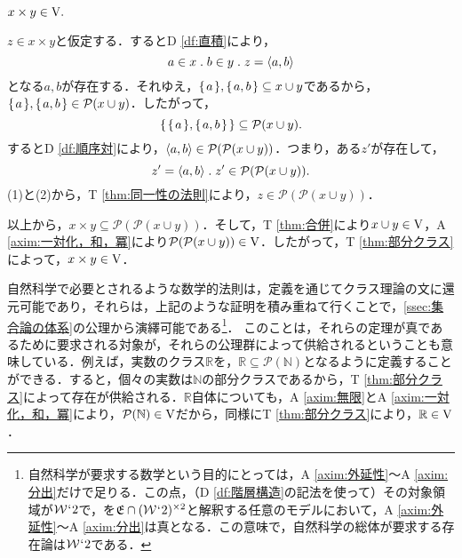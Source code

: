 \begin{thm}[直積]
\label{thm:直積}
$
    x\times y\in\mathrm{V}.
$
\end{thm}
\setcounter{equation}{0}
\begin{pf}
    $ z\in x\times y $と仮定する．するとD \ref{df:直積}により，
    \begin{equation}
        a\in x\con{1}b\in y\con{1}z = \orp{a,b}
    \end{equation}
    となる$a,b$が存在する．それゆえ，$ \{\mspace{2mu}a\mspace{2mu}\},\{\mspace{2mu}a,b\mspace{2mu}\}\subseteq x\cup y $であるから，$ \{\mspace{2mu}a\mspace{2mu}\},\{\mspace{2mu}a,b\mspace{2mu}\}\in\mathcal{P}(x\cup y)$．したがって，
    \[
        \{\mspace{2mu}\{\mspace{2mu}a\mspace{2mu}\},\{\mspace{2mu}a,b\mspace{2mu}\}\mspace{2mu}\}\subseteq\mathcal{P}(x\cup y).
    \]
    するとD \ref{df:順序対}により，$ \langle a,b \rangle\in\mathcal{P}(\mathcal{P}(x\cup y)) $．つまり，ある$ z' $が存在して，
    \begin{equation}
        z'=\orp{a,b}\con{1}z'\in \mathcal{P}(\mathcal{P}(x\cup y)).
    \end{equation}
    (1)と(2)から，T \ref{thm:同一性の法則}により，$ z\in\mathcal{P}(\mathcal{P}(x\cup y)) $．

    以上から，$ x\times y\subseteq \mathcal{P}(\mathcal{P}(x\cup y)) $．そして，T \ref{thm:合併}により$x\cup y\in\mathrm{V}$，A \ref{axim:一対化，和，冪}により$\mathcal{P}(\mathcal{P}(x\cup y))\in\mathrm{V}$．したがって，T \ref{thm:部分クラス}によって，$x\times y\in\mathrm{V}$．
\end{pf}

自然科学で必要とされるような数学的法則は，定義を通じてクラス理論の文に還元可能であり，それらは，上記のような証明を積み重ねて行くことで，\ref{ssec:集合論の体系}の公理から演繹可能である\footnote{
    自然科学が要求する数学という目的にとっては，A \ref{axim:外延性}〜A \ref{axim:分出}だけで足りる．この点，（D \ref{df:階層構造}の記法を使って）その対象領域が$\mathcal{W}{\mspace{1mu}{`}\mspace{1mu}} 2$で，\kagi{$ \in $}を$ \mathfrak{E}\cap(\mathcal{W}{\mspace{1mu}{`}\mspace{1mu}} 2)^{\times 2} $と解釈する任意のモデルにおいて，A \ref{axim:外延性}〜A \ref{axim:分出}は真となる．この意味で，自然科学の総体が要求する存在論は$ \mathcal{W}{\mspace{1mu}{`}\mspace{1mu}} 2 $である．
}．
このことは，それらの定理が真であるために要求される対象が，それらの公理群によって供給されるということも意味している．例えば，実数のクラス$\mathbb{R}$を，$ \mathbb{R}\subseteq\mathcal{P}(\mathbb{N}) $となるように定義することができる．すると，個々の実数は$\mathbb{N}$の部分クラスであるから，T \ref{thm:部分クラス}によって存在が供給される．$\mathbb{R}$自体についても，A \ref{axim:無限}とA \ref{axim:一対化，和，冪}により，$ \mathcal{P}(\mathbb{N})\in\mathrm{V} $だから，同様にT \ref{thm:部分クラス}により，$ \mathbb{R}\in\mathrm{V} $．

